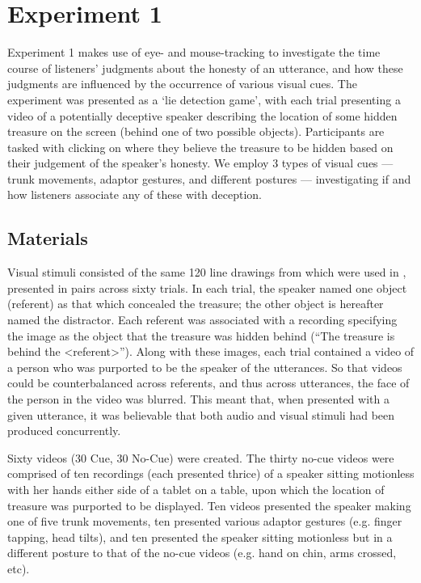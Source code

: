 \documentclass[a4paper,man,natbib]{apa6}
\begin{document}
\section{Experiment 1}
Experiment 1 makes use of eye- and mouse-tracking to investigate the time course of listeners' judgments about the honesty of an utterance, and how these judgments are influenced by the occurrence of various visual cues. 
The experiment was presented as a `lie detection game', with each trial presenting a video of a potentially deceptive speaker describing the location of some hidden treasure on the screen (behind one of two possible objects). 
Participants are tasked with clicking on where they believe the treasure to be hidden based on their judgement of the speaker's honesty.
We employ 3 types of visual cues --- trunk movements, adaptor gestures, and different postures --- investigating if and how listeners associate any of these with deception.



\subsection{Materials}
Visual stimuli consisted of the same 120 line drawings from \citet{Snodgrass1980} which were used in \citet{Loy2017}, presented in pairs across sixty trials. 
In each trial, the speaker named one object (referent) as that which concealed the treasure; the other object is hereafter named the distractor.
Each referent was associated with a recording specifying the image as the object that the treasure was hidden behind (``The treasure is behind the <referent>'').
Along with these images, each trial contained a video of a person who was purported to be the speaker of the utterances. 
So that videos could be counterbalanced across referents, and thus across utterances, the face of the person in the video was blurred. 
This meant that, when presented with a given utterance, it was believable that both audio and visual stimuli had been produced concurrently. 

Sixty videos (30 Cue, 30 No-Cue) were created. 
The thirty no-cue videos were comprised of ten recordings (each presented thrice) of a speaker sitting motionless with her hands either side of a tablet on a table, upon which the location of treasure was purported to be displayed.
Ten videos presented the speaker making one of five trunk movements, ten presented various adaptor gestures (e.g. finger tapping, head tilts), and ten presented the speaker sitting motionless but in a different posture to that of the no-cue videos (e.g. hand on chin, arms crossed, etc).
\end{document}
